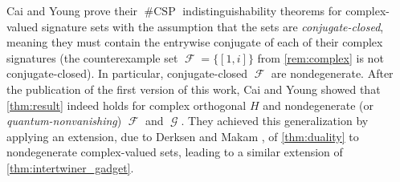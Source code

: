 \documentclass{article}
\DeclareMathOperator{\fc}{\mathcal{F}}
\DeclareMathOperator{\gc}{\mathcal{G}}
\DeclareMathOperator{\csp}{\#CSP}
\begin{document}
Cai and Young \cite{cai_planar_2023,young2022equality} prove their $\csp$
indistinguishability theorems for complex-valued signature sets with the assumption that the sets
are \emph{conjugate-closed}, meaning they must contain the entrywise conjugate of each of 
their complex signatures (the counterexample set $\fc = \{[1,i]\}$ from \autoref{rem:complex} 
is not conjugate-closed). In particular, conjugate-closed $\fc$ are nondegenerate.
After the publication of the first version \cite{orthogonal} of
this work, Cai and Young \cite{bipartite} showed that 
\autoref{thm:result} indeed holds for complex orthogonal $H$ and nondegenerate
(or \emph{quantum-nonvanishing}) $\fc$ and $\gc$. They achieved this generalization by
applying an extension, due to Derksen and Makam \cite{prop}, of 
\autoref{thm:duality} to nondegenerate complex-valued sets,
leading to a similar extension of \autoref{thm:intertwiner_gadget}.
\end{document}
